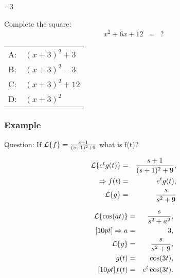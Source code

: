 {\begin{frame}
{   \vfill
   }\fi

  \ifnum\value{clickerQuiz}=3{%
    Complete the square:
     \begin{eqnarray*}
       x^2+6x+12 & = & ?
     \end{eqnarray*}

     \vspace{2em}
     \begin{tabular}{ll}
       A: &  $(x+3)^2+3$ \\ [12pt]
       B: &  $(x+3)^2-3$ \\ [12pt]
       C: &  $(x+3)^2+12$ \\ [12pt]
       D: &  $(x+3)^2$ \\ [12pt]
     \end{tabular}


  \vfill
 }\fi
\end{frame}
}


\begin{frame}
  \frametitle{Example}

  \begin{block}{Question:}
    If $\laplace{f} = \frac{s+1}{(s+1)^2+9}$ what is f(t)?
  \end{block}

  {
    \begin{eqnarray*}
      \laplace{e^{t}g(t)} & = & \frac{s+1}{(s+1)^2+9}, \\
      \Rightarrow f(t) & = & e^{t} g(t), \\
      \laplace{g} & = & \frac{s}{s^2+9}
    \end{eqnarray*}
  }



\end{frame}


\begin{frame}

    \begin{eqnarray*}
      \laplace{\cos(at)} & = & \frac{s}{s^2+a^2}, \\ [10pt]
      \Rightarrow a & = & 3, \\
      \laplace{g} & = & \frac{s}{s^2+9}, \\
      g(t) & = & \cos(3t), \\ [10pt]
      f(t) & = & e^{t}\cos(3t).
    \end{eqnarray*}

\end{frame}


